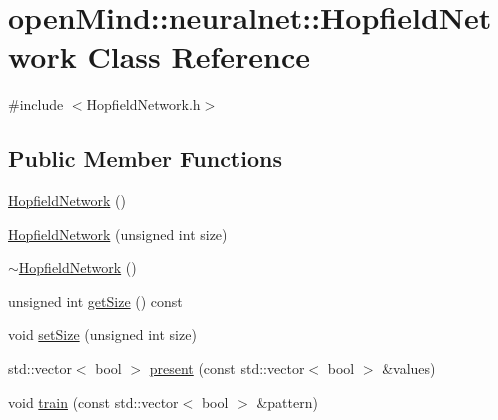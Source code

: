 \hypertarget{classopen_mind_1_1neuralnet_1_1_hopfield_network}{\section{open\+Mind\+:\+:neuralnet\+:\+:Hopfield\+Network Class Reference}
\label{classopen_mind_1_1neuralnet_1_1_hopfield_network}
}


{\ttfamily \#include $<$Hopfield\+Network.\+h$>$}

\subsection*{Public Member Functions}
\begin{DoxyCompactItemize}
\item 
\hyperlink{classopen_mind_1_1neuralnet_1_1_hopfield_network_ac71f77293aa344d68e5685773a5bb97e}{Hopfield\+Network} ()
\item 
\hyperlink{classopen_mind_1_1neuralnet_1_1_hopfield_network_a5141af63de79e9a1892ef863b3f0c144}{Hopfield\+Network} (unsigned int size)
\item 
\hyperlink{classopen_mind_1_1neuralnet_1_1_hopfield_network_a8b7fe9ccba6f8c6932fa303e20fdb79a}{$\sim$\+Hopfield\+Network} ()
\item 
unsigned int \hyperlink{classopen_mind_1_1neuralnet_1_1_hopfield_network_a0bf190337c1ffe6bf1ed53ba5ce4b722}{get\+Size} () const 
\item 
void \hyperlink{classopen_mind_1_1neuralnet_1_1_hopfield_network_a12f39a2033d9760cb34c6ddfd277ddd5}{set\+Size} (unsigned int size)
\item 
std\+::vector$<$ bool $>$ \hyperlink{classopen_mind_1_1neuralnet_1_1_hopfield_network_a1ffb42fb393b068ce212b5a90eecda2b}{present} (const std\+::vector$<$ bool $>$ \&values)
\item 
void \hyperlink{classopen_mind_1_1neuralnet_1_1_hopfield_network_a333c1a4eece0395f47e12c654d0f5f99}{train} (const std\+::vector$<$ bool $>$ \&pattern)
\end{DoxyCompactItemize}



